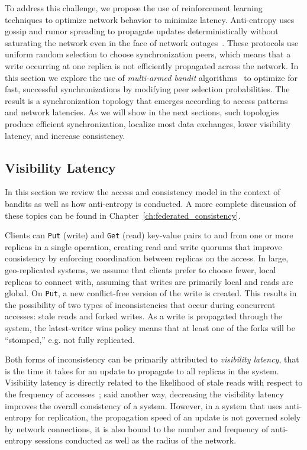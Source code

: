 To address this challenge, we propose the use of reinforcement learning techniques to optimize network behavior to minimize latency.
Anti-entropy uses gossip and rumor spreading to propagate updates
deterministically without saturating the
network even in the face of network
outages~\cite{gossip_protocols,rumor_spreading,rumor_spreading_dynamics}.
These protocols use uniform random selection to choose synchronization peers,
which means that a write occurring at one replica is not efficiently
propagated across the network.
In this section we explore the use of \textit{multi-armed bandit}
algorithms~\cite{epoch_greedy_mab,contextual_bandits} to optimize
for fast, successful synchronizations by modifying peer selection
probabilities.
The result is a synchronization topology that emerges according to access
patterns and network latencies.
As we will show in the next sections, such topologies produce efficient synchronization,
localize most data exchanges, lower visibility latency, and increase
consistency.

\subsection{Visibility Latency}
\label{ch06_visbility}

In this section we review the access and consistency model in the context of bandits as well as how anti-entropy is conducted.
A more complete discussion of these topics can be found in Chapter~\ref{ch:federated_consistency}.

Clients can \texttt{Put} (write) and \texttt{Get} (read) key-value pairs to
and from one or more replicas in a single operation, creating read and write quorums that improve consistency by enforcing coordination between replicas on the access.
In large, geo-replicated systems, we assume that clients prefer to choose fewer, local replicas to connect with, assuming that writes are primarily local and reads are global.
On \texttt{Put}, a new conflict-free version of the write is created.
This results in the possibility of two types of inconsistencies that occur during concurrent accesses: stale reads and forked writes.
As a write is propagated through the system, the latest-writer wins policy means that at least one of the forks will be ``stomped,'' e.g. not fully replicated.

Both forms of inconsistency can be primarily attributed to \emph{visibility
latency}, that is the time it takes for an update to propagate to all
replicas in the system.
Visibility latency is directly related to the likelihood of stale reads with
respect to the frequency of accesses~\cite{quantifying_pbs}; said
another way, decreasing the visibility latency improves the overall
consistency of a system.
However, in a system that uses anti-entropy for replication, the propagation
speed of an update is not governed solely by network connections, it is also
bound to the number and frequency of anti-entropy sessions conducted as well
as the radius of the network.

